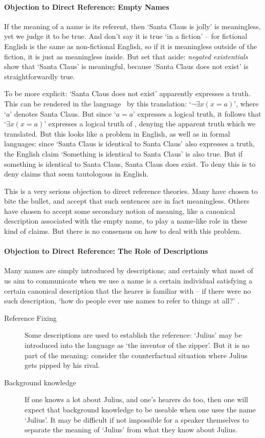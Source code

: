 \paragraph{Objection to Direct Reference: Empty Names}
If the meaning of a name is its referent, then `Santa Claus is jolly' is meaningless, yet we judge it to be true. And don't say it is true `in a fiction' – for fictional English is the same as non-fictional English, so if it is meaningless outside of the fiction, it is just as meaningless inside. But set that aside: \emph{negated existentials} show that `Santa Claus' is meaningful, because `Santa Claus does not exist' is straightforwardly true.



To be more explicit: `Santa Claus does not exist' apparently expresses a truth. This can be rendered in the language \lequ\ by this translation: `$\neg \exists x (x= a)$', where `$a$' denotes Santa Claus. But since `$a=a$' expresses a logical truth, it follows that `$\exists x (x = a)$' expresses a logical truth of \lequ, denying the apparent truth which we translated. But this looks like a problem in English, as well as in formal languages: since `Santa Claus is identical to Santa Claus' also expresses a truth, the English claim `Something is identical to Santa Claus' is also true. But if something is identical to Santa Claus, Santa Claus does exist. To deny this is to deny claims that seem tautologous in English. 

This is a very serious objection to direct reference theories. Many have chosen to bite the bullet, and accept that such sentences are in fact meaningless. Others have chosen to accept some secondary notion of meaning, like a canonical description associated with the empty name, to play a name-like role in these kind of claims. But there is no consensus on how to deal with this problem.

\paragraph{Objection to Direct Reference: The Role of Descriptions}
Many names are simply introduced by descriptions; and certainly what most of us aim to communicate when we use a name is a certain individual satisfying a certain canonical description that the hearer is familiar with – if there were no such description, `how do people ever use names to refer to things at all?' \citep[28]{krinamne}. 

\begin{description}
	\item [Reference Fixing] Some descriptions are used to establish the reference: `Julius' may be introduced into the language as `the inventor of the zipper'. But it is no part of the meaning: consider the counterfactual situation where Julius gets pipped by his rival.
	\item [Background knowledge] If one knows a lot about Julius, and one's hearers do too, then one will expect that background knowledge to be useable when one uses the name `Julius'. It may be difficult if not impossible for a speaker themselves to separate the meaning of `Julius' from what they know about Julius.
\end{description}

